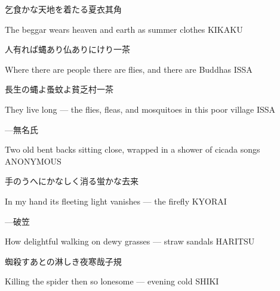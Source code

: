 \begin{haiku}
    {\FH 乞食かな天地を着たる夏衣}\hfill{\FH 其角}

    \vin{} The beggar
    \vin{} \vin{} wears heaven and earth
    \vin{} \vin{} \vin{} as summer clothes \hspace{\fill} KIKAKU
\end{haiku}

\begin{haiku}
    {\FH 人有れば蝿あり仏ありにけり}\hfill{\FH 一茶}

    \vin{} Where there are people
    \vin{} \vin{} there are flies, and
    \vin{} \vin{} \vin{} there are Buddhas \hspace{\fill} ISSA
\end{haiku}

\begin{haiku}
    {\FH 長生の蝿よ蚤蚊よ貧乏村}\hfill{\FH 一茶}

    \vin{} They live long ---
    \vin{} \vin{} the flies, fleas, and mosquitoes
    \vin{} \vin{} \vin{} in this poor village \hspace{\fill} ISSA
\end{haiku}

\begin{haiku}
    {---}\hfill{\FH 無名氏}

    \vin{} Two old bent backs
    \vin{} \vin{} sitting close, wrapped in
    \vin{} \vin{} \vin{} a shower of cicada songs \hspace{\fill} ANONYMOUS
\end{haiku}

\begin{haiku}
    {\FH 手のうへにかなしく消る蛍かな}\hfill{\FH 去来}

    \vin{} In my hand
    \vin{} \vin{} its fleeting light vanishes ---
    \vin{} \vin{} \vin{} the firefly \hspace{\fill} KYORAI
\end{haiku}

\begin{haiku}
    {---}\hfill{\FH 破笠}

    \vin{} How delightful
    \vin{} \vin{} walking on dewy grasses ---
    \vin{} \vin{} \vin{} straw sandals \hspace{\fill} HARITSU
\end{haiku}

\begin{haiku}
    {\FH 蜘殺すあとの淋しき夜寒哉}\hfill{\FH 子規}

    \vin{} Killing the spider
    \vin{} \vin{} then so lonesome ---
    \vin{} \vin{} \vin{} evening cold \hspace{\fill} SHIKI
\end{haiku}


